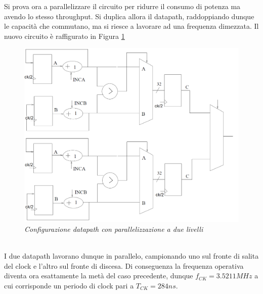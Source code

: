 \newpage
\noindent Si prova ora a parallelizzare il circuito per ridurre il consumo di potenza ma avendo lo stesso throughput. Si duplica allora il datapath, raddoppiando dunque le capacità che commutano, ma si riesce a lavorare ad una frequenza dimezzata. Il nuovo circuito è raffigurato in Figura \ref{circuito_parallel}
\begin{figure}[!htb]
	\centering
	\includegraphics[scale=0.8]{immagini/circuito_parallel}
	\caption{\textit{Configurazione datapath con parallelizzazione a due livelli}}
	\label{circuito_parallel}
\end{figure}
\\
I due datapath lavorano dunque in parallelo, campionando uno sul fronte di salita del clock e l'altro sul fronte di discesa. Di conseguenza la frequenza operativa diventa ora esattamente la metà del caso precedente, dunque $f_{CK}=3.5211 MHz$ a cui corrisponde un periodo di clock pari a $T_{CK}=284 ns$.





